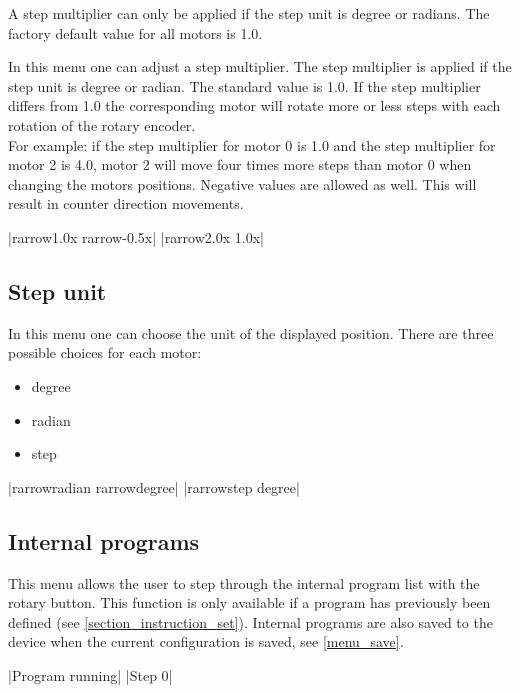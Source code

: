 A step multiplier can only be applied if the step unit is degree or radians.
The factory default value for all motors is 1.0.

In this menu one can adjust a step multiplier. The step multiplier is
applied if the step unit is degree or radian. The standard value is 1.0.
If the step multiplier differs from 1.0 the corresponding motor will
rotate more or less steps with each rotation of the rotary encoder.\\
For example: if the step multiplier for motor 0 is 1.0 and the step
multiplier for motor 2 is 4.0, motor 2 will move four times more steps
than motor 0 when changing the motors positions. Negative values are
allowed as well. This will result in counter direction movements.
\begin{center}
  |{rarrow}1.0x   {rarrow}-0.5x|
             |{rarrow}2.0x    1.0x|
\end{center}

\subsection{Step unit}
\label{chp:change_step_unit}
In this menu one can choose the unit of the displayed position. There
are three possible choices for each motor:
\begin{itemize}
\item degree
\item radian
\item step
\end{itemize}
\begin{center}
  |{rarrow}radian {rarrow}degree|
             |{rarrow}step    degree|
\end{center}

\subsection{Internal programs}
This menu allows the user to step through the internal program list
with the rotary button.
This function is only available if a program has previously been
defined (see \ref{section_instruction_set}).
Internal programs are also saved to the device when the current
configuration is saved, see \ref{menu_save}.
\begin{center}
  |Program running|
             |Step 0|
\end{center}

